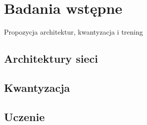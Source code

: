 \chapter{Badania wstępne}
\label{cha:Badania wstępne}
Propozycja architektur, kwantyzacja i trening

\section{Architektury sieci}

\section{Kwantyzacja}

\section{Uczenie}



